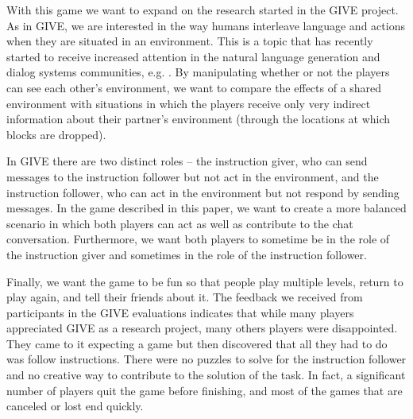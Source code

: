 With this game we want to expand on the research started in the GIVE
project. As in GIVE, we are interested in the way humans interleave
language and actions when they are situated in an environment. This is
a topic that has recently started to receive increased attention in
the natural language generation and dialog systems communities, e.g.
\cite{stoia-etal-2006,garoufi-koller-2010,dethlefs-etal-2011}.  By
manipulating whether or not the players can see each other's
environment, we want to compare the effects of a shared environment
with situations in which the players receive only very indirect
information about their partner's environment (through the locations
at which blocks are dropped).

In GIVE there are two distinct roles -- the instruction giver, who can
send messages to the instruction follower but not act in the
environment, and the instruction follower, who can act in the
environment but not respond by sending messages. In the game described
in this paper, we want to create a more balanced scenario in which
both players can act as well as contribute to the chat
conversation. Furthermore, we want both players to sometime be in the
role of the instruction giver and sometimes in the role of the
instruction follower.


Finally, we want the game to be fun so that people play multiple
levels, return to play again, and tell their friends about it.  The
feedback we received from participants in the GIVE evaluations
indicates that while many players appreciated GIVE as a research
project, many others players were disappointed. They came to it
expecting a game but then discovered that all they had to do was
follow instructions. There were no puzzles to solve for the
instruction follower and no creative way to contribute to the solution
of the task. In fact, a significant number of players quit the game
before finishing, and most of the games that are canceled or lost end
quickly.






